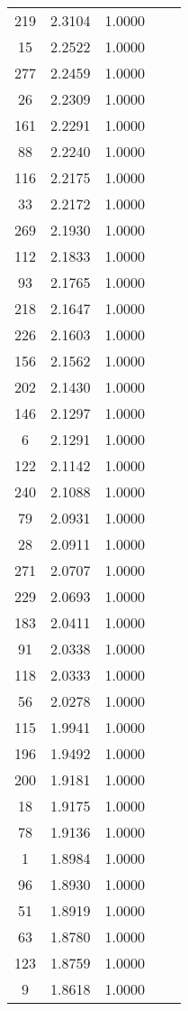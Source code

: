 \documentclass[12pt]{article}\usepackage[]{graphicx}\usepackage[]{color}
\begin{document}
\begin{longtable}[c]{ccccc}
	219	& 2.3104 & 1.0000 & & \\
	15	& 2.2522 & 1.0000 & & \\
	277	& 2.2459 & 1.0000 & & \\
	26	& 2.2309 & 1.0000 & & \\
	161	& 2.2291 & 1.0000 & & \\
	88	& 2.2240 & 1.0000 & & \\
	116	& 2.2175 & 1.0000 & & \\
	33	& 2.2172 & 1.0000 & & \\
	269	& 2.1930 & 1.0000 & & \\
	112	& 2.1833 & 1.0000 & & \\
	93	& 2.1765 & 1.0000 & & \\
	218	& 2.1647 & 1.0000 & & \\
	226	& 2.1603 & 1.0000 & & \\
	156	& 2.1562 & 1.0000 & & \\
	202	& 2.1430 & 1.0000 & & \\
	146	& 2.1297 & 1.0000 & & \\
	6	& 2.1291 & 1.0000 & & \\
	122	& 2.1142 & 1.0000 & & \\
	240	& 2.1088 & 1.0000 & & \\
	79	& 2.0931 & 1.0000 & & \\
	28	& 2.0911 & 1.0000 & & \\
	271	& 2.0707 & 1.0000 & & \\
	229	& 2.0693 & 1.0000 & & \\
	183	& 2.0411 & 1.0000 & & \\
	91	& 2.0338 & 1.0000 & & \\
	118	& 2.0333 & 1.0000 & & \\
	56	& 2.0278 & 1.0000 & & \\
	115	& 1.9941 & 1.0000 & & \\
	196	& 1.9492 & 1.0000 & & \\
	200	& 1.9181 & 1.0000 & & \\
	18	& 1.9175 & 1.0000 & & \\
	78	& 1.9136 & 1.0000 & & \\
	1	& 1.8984 & 1.0000 & & \\
	96	& 1.8930 & 1.0000 & & \\
	51	& 1.8919 & 1.0000 & & \\
	63	& 1.8780 & 1.0000 & & \\
	123	& 1.8759 & 1.0000 & & \\
	9	& 1.8618 & 1.0000 & & \\

\end{longtable}
\end{document}
